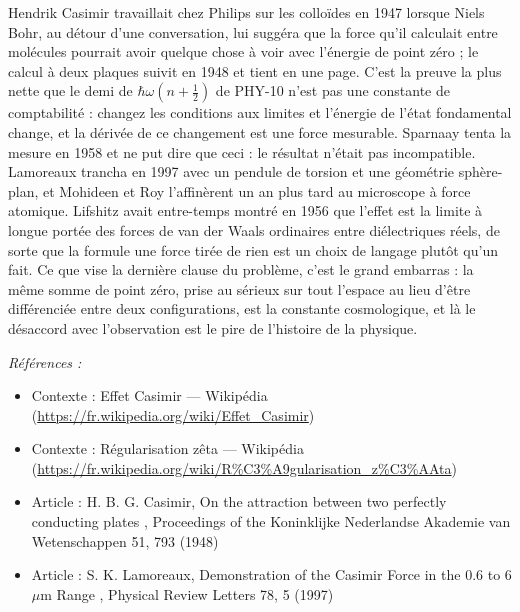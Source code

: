 \documentclass[11pt]{article}
\newenvironment{refs}{\par\small\noindent\emph{Références :}\begin{itemize}\setlength\itemsep{0pt}}{\end{itemize}\normalsize}
\begin{document}
\noindent Hendrik Casimir travaillait chez Philips sur les colloïdes en 1947 lorsque
Niels Bohr, au détour d'une conversation, lui suggéra que la force qu'il calculait entre molécules
pourrait avoir quelque chose à voir avec l'énergie de point zéro ; le calcul à deux plaques suivit
en 1948 et tient en une page. C'est la preuve la plus nette que le demi de
$ \hbar\omega(n+\tfrac12) $ de PHY-10 n'est pas une constante de comptabilité : changez les
conditions aux limites et l'énergie de l'état fondamental change, et la dérivée de ce changement
est une force mesurable. Sparnaay tenta la mesure en 1958 et ne put dire que ceci : le résultat
n'était pas incompatible. Lamoreaux trancha en 1997 avec un pendule de torsion et une géométrie
sphère-plan, et Mohideen et Roy l'affinèrent un an plus tard au microscope à force atomique.
Lifshitz avait entre-temps montré en 1956 que l'effet est la limite à longue portée des forces de
van der Waals ordinaires entre diélectriques réels, de sorte que la formule \og{} une force tirée de
rien \fg{} est un choix de langage plutôt qu'un fait. Ce que vise la dernière clause du problème, c'est
le grand embarras : la même somme de point zéro, prise au sérieux sur tout l'espace au lieu d'être
différenciée entre deux configurations, est la constante cosmologique, et là le désaccord avec
l'observation est le pire de l'histoire de la physique.

\begin{refs}
\item Contexte : Effet Casimir --- Wikipédia (\url{https://fr.wikipedia.org/wiki/Effet_Casimir})
\item Contexte : Régularisation zêta --- Wikipédia (\url{https://fr.wikipedia.org/wiki/R%C3%A9gularisation_z%C3%AAta})
\item Article : H. B. G. Casimir, \og{} On the attraction between two perfectly conducting plates \fg{}, Proceedings of the Koninklijke Nederlandse Akademie van Wetenschappen 51, 793 (1948)
\item Article : S. K. Lamoreaux, \og{} Demonstration of the Casimir Force in the 0.6 to 6 $\mu$m Range \fg{}, Physical Review Letters 78, 5 (1997)
\end{refs}

\bigskip
\end{document}
